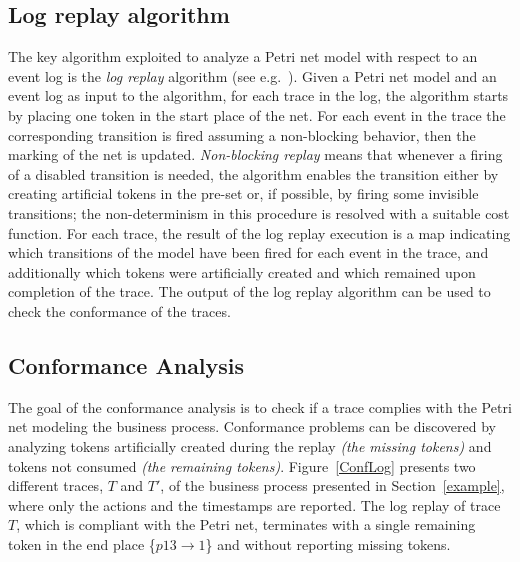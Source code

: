 \documentclass{llncs}
\begin{document}
\subsection{Log replay algorithm}\label{logreplayAlg}
The key algorithm exploited to analyze a Petri net model with respect to an event log is the {\itshape log replay} algorithm (see e.g.~\cite{DBLP:journals/is/RozinatA08}). Given a Petri net model and an event log as input to the algorithm, for each trace in the log, the algorithm starts by placing one token in the start place of the net. For each event in the trace the corresponding transition is fired assuming a  non-blocking behavior, then the marking of the net is updated. \emph{Non-blocking replay} means that whenever a firing of a disabled transition is needed, the algorithm enables the transition either by creating artificial tokens in the pre-set or, if possible, by firing some invisible transitions; the non-determinism in this procedure is resolved with a suitable cost function. For each trace, the result of the log replay execution is a map indicating which transitions of the model have been fired for each event in the trace, and additionally which tokens were artificially created and which remained  upon completion of the trace. The output of the log replay algorithm  can be used to check the conformance of the traces.

\subsection{Conformance Analysis}\label{ConformanceAnalysis}
The goal of the conformance analysis is to check if a trace complies with the Petri net modeling the business process. Conformance problems can be discovered by analyzing tokens artificially created during the replay {\itshape (the missing tokens)} and tokens not consumed {\itshape (the remaining tokens)}. Figure~\ref{ConfLog}  presents two different traces, $T$ and $T'$, of the business process presented in Section~\ref{example}, where only the actions and the timestamps are reported. The log replay of trace $T$, which is compliant with the Petri net, terminates with a single remaining token in the end place \{${p13 \rightarrow 1}$\} and without reporting  missing tokens.

\end{document}
